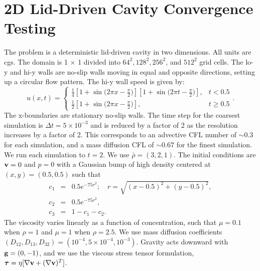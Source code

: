 \documentclass[final]{siamltex}
\def\gb {{\bf g}}
\def\vb {{\bf v}}
\def\taub   {\boldsymbol{\tau}}
\begin{document}
\section{2D Lid-Driven Cavity Convergence Testing}
The problem is a deterministic lid-driven cavity in two dimensions.
All units are cgs.
The domain is 1 $\times$ 1 divided into $64^2, 128^2, 256^2$, and $512^2$ grid cells.
The lo-y and hi-y walls are no-slip walls moving in equal and opposite directions,
setting up a circular flow pattern.  The hi-y wall speed is given by:
\begin{equation}
u(x,t) =
\begin{cases}
\frac{1}{4}\left[1 + \sin{(2\pi x - \frac{\pi}{2}})\right]
           \left[1 + \sin{(2\pi t - \frac{\pi}{2}})\right], & t < 0.5\\
\frac{1}{2}\left[1 + \sin{(2\pi x - \frac{\pi}{2}})\right], & t \ge 0.5
\end{cases}.
\end{equation}
The x-boundaries are stationary no-slip walls.
The time step for the coarsest simulation is $\Delta t=5\times 10^{-3}$ 
and is reduced by a factor of 2 as the resolution increases by a factor of 2.
This corresponds to an advective CFL number of $\sim 0.3$ for each simulation, and
a mass diffusion CFL of $\sim 0.67$ for the finest simulation.
We run each simulation to $t=2$.
We use $\bar\rho = (3,2,1)$.
The initial conditions are $\vb=0$ and $p=0$ with
a Gaussian bump of high density centered at $(x,y) = (0.5, 0.5)$ such that
\begin{eqnarray}
c_1 &=& 0.5e^{-75r^2}; \quad r = \sqrt{(x-0.5)^2 + (y-0.5)^2}, \\
c_2 &=& 0.5e^{-75r^2}, \\
c_3 &=& 1 - c_1 - c_2.
\end{eqnarray}
The viscosity varies linearly as a function of concentration, such that $\mu=0.1$
when $\rho=1$ and $\mu=1$ when $\rho=2.5$.  We use mass diffusion coefficients
$(D_{12},D_{13},D_{32}) = (10^{-4},5\times 10^{-4},10^{-3})$.
Gravity acts downward with $\gb=(0,-1)$, and we use
the viscous stress tensor formulation, $\taub = \eta[\nabla\vb + (\nabla\vb)^T]$.
\end{document}
